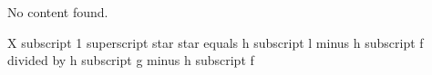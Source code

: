 No content found.

X subscript 1 superscript star star equals h subscript l minus h subscript f divided by h subscript g minus h subscript f
